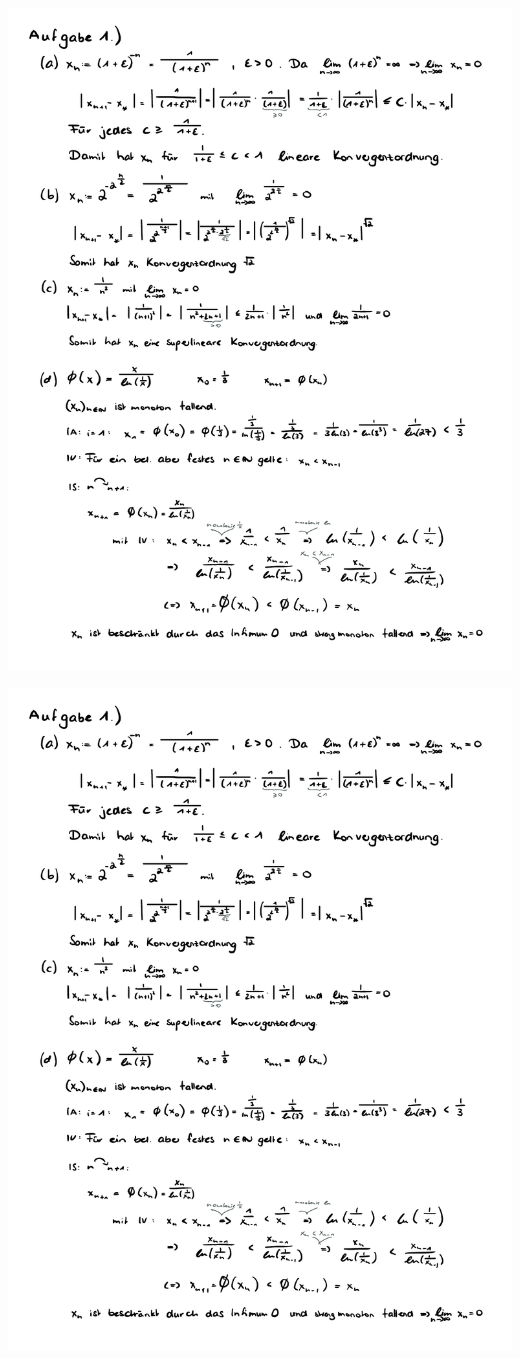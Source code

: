 \documentclass[a4paper,oneside,11pt]{scrartcl}
\begin{document}
\begin{minipage}[t]{\textwidth}
\includegraphics[scale = 0.75, page=2]{AlMa1_Zettel05.pdf}
\end{minipage}
\pagebreak
\begin{minipage}[t]{\textwidth}
\includegraphics[scale = 0.75, page=3]{AlMa1_Zettel05.pdf}
\end{minipage}
\end{document}
